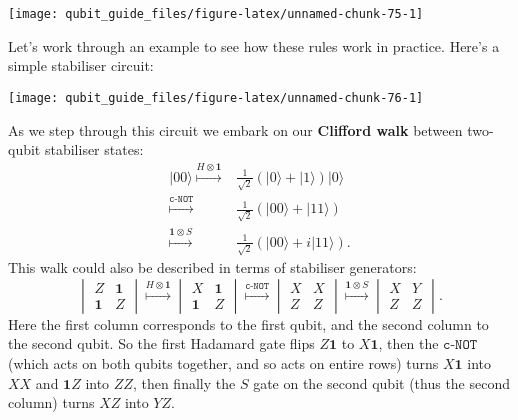 \documentclass[fleqn]{article}
\begin{document}
\begin{center}\texttt{[image: qubit\_guide\_files/figure-latex/unnamed-chunk-75-1]} \end{center}

Let's work through an example to see how these rules work in practice.
Here's a simple stabiliser circuit:

\begin{center}\texttt{[image: qubit\_guide\_files/figure-latex/unnamed-chunk-76-1]} \end{center}

As we step through this circuit we embark on our \textbf{Clifford walk} between two-qubit stabiliser states:
\[
  \begin{aligned}
    |00\rangle
    \overset{H\otimes\mathbf{1}}{\longmapsto}
    &\frac{1}{\sqrt{2}}(|0\rangle+|1\rangle)|0\rangle
  \\\overset{\texttt{c-NOT}}{\longmapsto}
    &\frac{1}{\sqrt{2}}(|00\rangle+|11\rangle)
  \\\overset{\mathbf{1}\otimes S}{\longmapsto}
    &\frac{1}{\sqrt{2}}(|00\rangle+i|11\rangle).
  \end{aligned}
\]
This walk could also be described in terms of stabiliser generators:
\[
  \begin{vmatrix}
    Z&\mathbf{1}
  \\\mathbf{1}&Z
  \end{vmatrix}
  \overset{H\otimes\mathbf{1}}{\longmapsto}
  \begin{vmatrix}
    X&\mathbf{1}
  \\\mathbf{1}&Z
  \end{vmatrix}
  \overset{\texttt{c-NOT}}{\longmapsto}
  \begin{vmatrix}
    X&X
  \\Z&Z
  \end{vmatrix}
  \overset{\mathbf{1}\otimes S}{\longmapsto}
  \begin{vmatrix}
    X&Y
  \\Z&Z
  \end{vmatrix}.
\]
Here the first column corresponds to the first qubit, and the second column to the second qubit.
So the first Hadamard gate flips \(Z\mathbf{1}\) to \(X\mathbf{1}\), then the \(\texttt{c-NOT}\) (which acts on both qubits together, and so acts on entire rows) turns \(X\mathbf{1}\) into \(XX\) and \(\mathbf{1}Z\) into \(ZZ\), then finally the \(S\) gate on the second qubit (thus the second column) turns \(XZ\) into \(YZ\).
\end{document}
